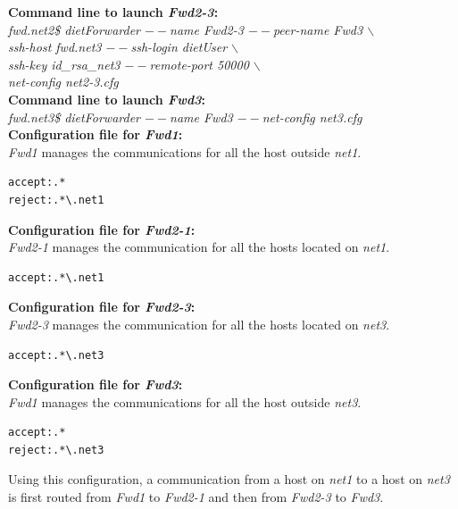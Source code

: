 \noindent\textbf{Command line to launch \textit{Fwd2-3}: }\\
{\small \it fwd.net2\$ dietForwarder {\tiny$--$}name Fwd2-3
  {\tiny$--$}peer-name Fwd3 $\backslash$\\
  \hspace*{4.2cm}{\tiny$--$}ssh-host fwd.net3 {\tiny$--$}ssh-login
  dietUser $\backslash$\\
  \hspace*{4.2cm}{\tiny$--$}ssh-key id\_rsa\_net3
  {\tiny$--$}remote-port 50000 $\backslash$\\
  \hspace*{4.2cm}{\tiny$--$}net-config net2-3.cfg}\\[2mm]

\noindent\textbf{Command line to launch \textit{Fwd3}: }\\
{\small \it fwd.net3\$ dietForwarder {\tiny$--$}name Fwd3
  {\tiny$--$}net-config net3.cfg}\\[3mm]

\noindent\textbf{Configuration file for \textit{Fwd1}:}\\
\textit{Fwd1} manages the communications for all the host outside
\textit{net1}.
\begin{verbatim}
accept:.*
reject:.*\.net1
\end{verbatim}

\noindent\textbf{Configuration file for \textit{Fwd2-1}:}\\
\textit{Fwd2-1} manages the communication for all the hosts located on
\textit{net1}.
\begin{verbatim}
accept:.*\.net1
\end{verbatim}

\noindent\textbf{Configuration file for \textit{Fwd2-3}:}\\
\textit{Fwd2-3} manages the communication for all the hosts located on
\textit{net3}.
\begin{verbatim}
accept:.*\.net3
\end{verbatim}

\noindent\textbf{Configuration file for \textit{Fwd3}:}\\
\textit{Fwd1} manages the communications for all the host outside
\textit{net3}.
\begin{verbatim}
accept:.*
reject:.*\.net3
\end{verbatim}

Using this configuration, a communication from a host on \textit{net1}
to a host on \textit{net3} is first routed from \textit{Fwd1} to
\textit{Fwd2-1} and then from \textit{Fwd2-3} to \textit{Fwd3}.
